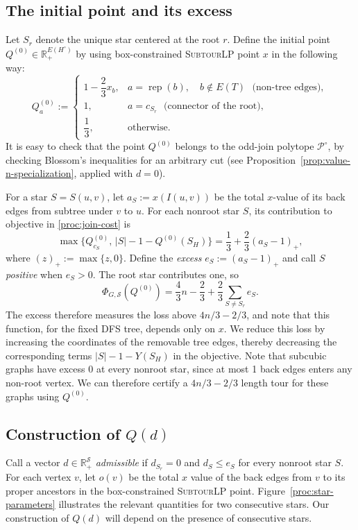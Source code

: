 \documentclass[11pt]{amsart}
\DeclareMathOperator{\R}{\mathbb{R}}
\newcommand{\rep}[1]{\operatorname{rep}(#1)}
\def\R{{\mathbb R}}
\newcommand{\1}{\mathbbm{1}}
\newcommand{\SubtourLP}{\textsc{SubtourLP}}
\begin{document}
\subsection{The initial point and its excess}
\label{proc:value-n-points}

{Let $S_r$ denote the unique star centered at the root $r$.}
Define the initial point $Q^{(0)}\in\R_+^{E(H^\circ)}$ {by using box-constrained \SubtourLP{}  point $x$ in the following way}:
\[
 Q^{(0)}_a :=
 \begin{cases}
  1-\dfrac23x_b,
     &a=\rep{b},\quad b\notin E(T) \text{ {(non-tree edges)}},\\[5pt]
  1,&a=c_{S_r} \text{ {(connector of the root)}},\\[3pt]
  \dfrac13,&\text{otherwise}.
 \end{cases}
\]
{It is easy to check that the point $Q^{(0)}$ belongs to the odd-join polytope $\mathcal P^\circ$, by checking Blossom's inequalities for an arbitrary cut (see Proposition~\ref{prop:value-n-specialization}, applied with
$d=0$). } 

{For a star $S=S(u,v)$, let $a_S:=x(I(u,v))$ be the total
$x$-value of its back edges {from subtree under $v$ to $u$}. For each nonroot star $S$,
its contribution to {objective in} \eqref{proc:join-cost} is
\[
 \max\{Q^{(0)}_{c_S},\,|S|-1-Q^{(0)}(S_H)\}
 =\frac13+\frac23(a_S-1)_+,
\]
where $(z)_+:=\max\{z,0\}$.
Define the \emph{excess} $e_S:=(a_S-1)_+$ and call $S$
\emph{positive} when $e_S>0$. The root star contributes one,
so
\begin{equation}\label{proc:initial-cost}
 \Phi_{G,\mathcal S}(Q^{(0)})
 =\frac43n-\frac23+\frac23\sum_{S\ne S_r}e_S.
\end{equation}
The excess therefore measures the loss above $4n/3-2/3$, and note that this function, for the fixed DFS tree, depends only on $x$.
We reduce this loss by increasing the coordinates of the
removable tree edges, thereby decreasing the corresponding
terms $|S|-1-Y(S_H)$ in the objective.} {Note that subcubic graphs have excess 0 at every nonroot star, since at most 1 back edges enters any non-root vertex. We can therefore certify a $4n/3-2/3$ length tour for these graphs using $Q^{(0)}$.}

\subsection{Construction of $Q(d)$}
\label{proc:increases}

{Call a vector $d\in\R_+^{\mathcal S}$ \emph{admissible} if
$d_{S_r}=0$ and $d_S\le e_S$ for every nonroot star $S$.
For each vertex $v$, let $o(v)$ be the total $x$ value of
the back edges from $v$ to its proper ancestors in the box-constrained \SubtourLP{} point.
Figure~\ref{proc:star-parameters} illustrates the relevant
quantities for two consecutive stars. Our construction of $Q(d)$ will depend on the presence of consecutive stars.}
\end{document}
